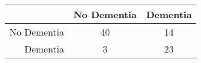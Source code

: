 \begin{table}[ht]
\centering
\begin{tabular}{r|c|c}
  \hline
 & No Dementia & Dementia \\ 
  \hline
No Dementia & 40 & 14 \\ 
  Dementia & 3 & 23 \\ 
   \hline
\end{tabular}
\end{table}
